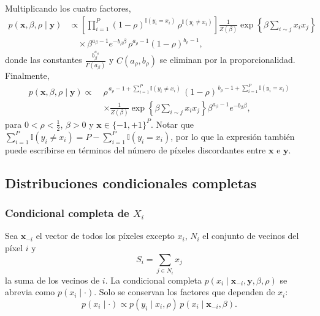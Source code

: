 \documentclass[11pt,a4paper]{article}
\begin{document}
Multiplicando los cuatro factores,
\begin{align*}
p(\boldsymbol{x}, \beta, \rho \mid \boldsymbol{y}) &\propto \left[ \prod_{i=1}^{P} (1-\rho)^{\mathbb{I}(y_i = x_i)}\, \rho^{\mathbb{I}(y_i \neq x_i)} \right] \frac{1}{Z(\beta)} \exp\left\{ \beta \sum_{i \sim j} x_i x_j \right\} \\
&\quad \times \beta^{a_\beta - 1} e^{-b_\beta \beta}\, \rho^{a_\rho - 1} (1-\rho)^{b_\rho - 1},
\end{align*}
donde las constantes $\frac{b_\beta^{a_\beta}}{\Gamma(a_\beta)}$ y $C(a_\rho, b_\rho)$ se eliminan por la proporcionalidad. Finalmente,
\[
\begin{aligned}
p(\boldsymbol{x}, \beta, \rho \mid \boldsymbol{y}) \propto\;& \rho^{\,a_\rho - 1 + \sum_{i=1}^{P} \mathbb{I}(y_i \neq x_i)}\, (1-\rho)^{\,b_\rho - 1 + \sum_{i=1}^{P} \mathbb{I}(y_i = x_i)} \\
&\times \frac{1}{Z(\beta)} \exp\left\{ \beta \sum_{i \sim j} x_i x_j \right\} \beta^{a_\beta - 1} e^{-b_\beta \beta},
\end{aligned}
\]
para $0 < \rho < \tfrac{1}{2}$, $\beta > 0$ y $\boldsymbol{x} \in \{-1,+1\}^P$. Notar que $\sum_{i=1}^{P} \mathbb{I}(y_i \neq x_i) = P - \sum_{i=1}^{P} \mathbb{I}(y_i = x_i)$, por lo que la expresión también puede escribirse en términos del número de píxeles discordantes entre $\boldsymbol{x}$ e $\boldsymbol{y}$.

\subsection{Distribuciones condicionales completas}

\subsubsection*{Condicional completa de $X_i$}

Sea $\boldsymbol{x}_{-i}$ el vector de todos los píxeles excepto $x_i$, $N_i$ el conjunto de vecinos del píxel $i$ y
\[
S_i = \sum_{j \in N_i} x_j
\]
la suma de los vecinos de $i$. La condicional completa $p(x_i \mid \boldsymbol{x}_{-i}, \boldsymbol{y}, \beta, \rho)$ se abrevia como $p(x_i \mid \cdot)$. Solo se conservan los factores que dependen de $x_i$:
\[
p(x_i \mid \cdot) \propto p(y_i \mid x_i, \rho)\, p(x_i \mid \boldsymbol{x}_{-i}, \beta).
\]
\end{document}
